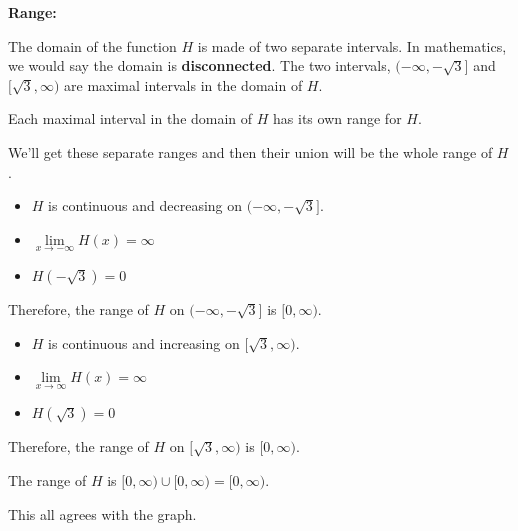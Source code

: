\documentclass{ximera}
\begin{document}
\textbf{\textcolor{blue!55!black}{Range:}} 

The domain of the function $H$ is made of two separate intervals. In mathematics, we would say the domain is \textbf{disconnected}.  The two intervals, $( -\infty, -\sqrt{3} ]$ and $[ \sqrt{3} ,\infty)$ are maximal intervals in the domain of $H$.

Each maximal interval in the domain of $H$ has its own range for $H$.

We'll get these separate ranges and then their union will be the whole range of $H$.



\begin{itemize}
\item $H$ is continuous and decreasing on $( -\infty, -\sqrt{3} ]$. 
\item $\lim\limits_{x \to -\infty} H(x) = \infty$ 
\item $H(-\sqrt{3}) = 0$
\end{itemize}

Therefore, the range of $H$ on $( -\infty, -\sqrt{3} ]$ is $[0, \infty)$. 




\begin{itemize}
\item $H$ is continuous and increasing on $[ \sqrt{3} ,\infty)$. 
\item $\lim\limits_{x \to \infty} H(x) = \infty$ \\
\item $H(\sqrt{3}) = 0$
\end{itemize}

Therefore, the range of $H$ on $[ \sqrt{3}, \infty )$ is $[0, \infty)$. 








The range of $H$ is $[0, \infty) \cup [0, \infty) = [0, \infty)$.




This all agrees with the graph. 
\end{document}
